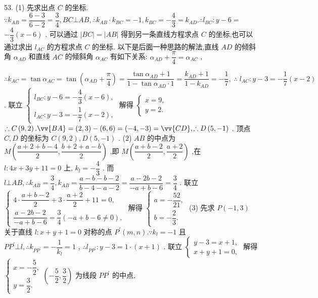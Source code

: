 53. (1) 先求出点 $C$ 的坐标. $\because {k}_{AB} = \dfrac{6 - 3}{6 - 2} = \dfrac{3}{4},{BC}\bot {AB},\therefore {k}_{AB} \cdot  {k}_{BC} =  - 1,{k}_{BC} =  - \dfrac{4}{3} = {k}_{AD}.\therefore {l}_{BC} : y - 6 =$  $- \dfrac{4}{3}\left( {x - 6}\right)$ . 可以通过 $\left| {BC}\right|  = \left| {AB}\right|$ 得到另一条直线方程求点 $C$ 的坐标,也可以通过求出 ${l}_{AC}$ 的方程求点 $C$ 的坐标. 以下是后面一种思路的解法,直线 ${AD}$ 的倾斜角 ${\alpha }_{AD}$ 和直线 ${AC}$ 的倾斜角 ${\alpha }_{AC}$ 有如下关系: ${\alpha }_{AD} + \dfrac{\pi }{4} = {\alpha }_{AC}$ ,

$\therefore {k}_{AC} = \tan {\alpha }_{AC} = \tan \left( {{\alpha }_{AD} + \dfrac{\pi }{4}}\right)  = \dfrac{\tan {\alpha }_{AD} + 1}{1 - \tan {\alpha }_{AD} \cdot  1} = \dfrac{{k}_{AD} + 1}{1 - {k}_{AD}} =  - \dfrac{1}{7},\;\therefore \;{l}_{AC} : y - 3 =  - \dfrac{1}{7}\left( {x - 2}\right)$ . 联立 $\left\{  {\begin{array}{l} {l}_{BC} : y - 6 =  - \dfrac{4}{3}\left( {x - 6}\right) , \\  {l}_{AC} : y - 3 =  - \dfrac{1}{7}\left( {x - 2}\right) , \end{array}\text{ 解得 }\left\{  \begin{array}{l} x = 9, \\  y = 2. \end{array}\right. }\right.$  $\therefore C\left( {9,2}\right) .\vv{BA} = \left( {2,3}\right)  - \left( {6,6}\right)  = \left( {-4, - 3}\right)  = \vv{CD},\therefore D\left( {5, - 1}\right)$ . 顶点 $C,D$ 的坐标为 $C\left( {9,2}\right) ,D\left( {5, - 1}\right)$ . (2) ${AB}$ 的中点为 $M\left( {\dfrac{a + 2 + b - 4}{2},\dfrac{b + 2 + a - b}{2}}\right)$ ,即 $M\left( {\dfrac{a + b - 2}{2},\dfrac{a + 2}{2}}\right)$ ,在 $l : {4x} + {3y} + {11} = 0$ 上, ${k}_{l} =  - \dfrac{4}{3}$ . 而 $l\bot {AB},\therefore {k}_{AB} = \dfrac{3}{4},{k}_{AB} = \dfrac{a - b - b - 2}{b - 4 - a - 2} = \dfrac{a - {2b} - 2}{-a + b - 6} = \dfrac{3}{4}$ . 联立 $\left\{  \begin{array}{l} 4 \cdot  \dfrac{a + b - 2}{2} + 3 \cdot  \dfrac{a + 2}{2} + {11} = 0, \\  \dfrac{a - {2b} - 2}{-a + b - 6} = \dfrac{3}{4}\left( {-a + b - 6 \neq  0}\right) , \end{array}\right.$ 解得 $\left\{  \begin{array}{l} a =  - \dfrac{52}{21}, \\  b =  - \dfrac{2}{3}. \end{array}\right.$ (3) 先求 $P\left( {-1,3}\right)$ 关于直线 $l : x + y + 1 = 0$ 对称的点 ${P}^{\prime }\left( {m,n}\right) .\because {k}_{l} =  - 1$ 且 $P{P}^{\prime }\bot l,\therefore {k}_{P{P}^{\prime }} =  - \dfrac{1}{{k}_{l}} = 1$ , $\therefore {l}_{P{P}^{\prime }} : y - 3 = 1 \cdot  \left( {x + 1}\right)$ . 联立 $\left\{  \begin{array}{l} y - 3 = x + 1, \\  x + y + 1 = 0, \end{array}\right.$ 解得 $\left\{  \begin{array}{l} x =  - \dfrac{5}{2}, \\  y = \dfrac{3}{2}. \end{array}\right. \left( {-\dfrac{5}{2},\dfrac{3}{2}}\right)$ 为线段 $P{P}^{\prime }$ 的中点, 